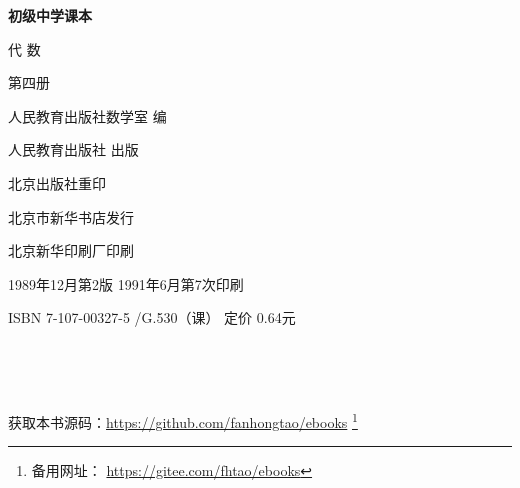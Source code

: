 \begin{titlepage}
    \begin{center}
        \vspace*{3cm}

        {\Large \textbf{初级中学课本} }

        \vspace{1cm}

        {\Huge 代 \qquad 数}

        \vspace{1.5cm}

        {\Large 第四册}

        \vspace{1cm}

        {\Large 人民教育出版社数学室 \quad 编}

        \vfill

        人民教育出版社 出版

        北京出版社重印

        北京市新华书店发行

        北京新华印刷厂印刷

        1989年12月第2版  \qquad 1991年6月第7次印刷

        ISBN 7-107-00327-5 /G.530（课） \quad 定价 0.64元

        \,

        \,

        获取本书源码：\url{https://github.com/fanhongtao/ebooks} \footnote{备用网址： \url{https://gitee.com/fhtao/ebooks} }
    \end{center}
 \end{titlepage}
